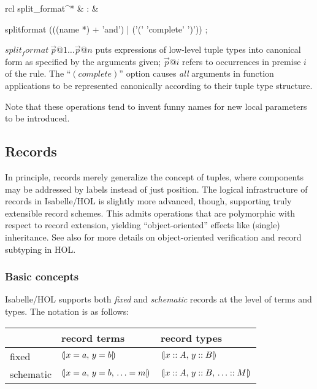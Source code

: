 \begin{matharray}{rcl}
  split_format^* & : & \isaratt \\
\end{matharray}


\begin{rail}
  splitformat (((name *) + 'and') | ('(' 'complete' ')'))
  ;
\end{rail}

\begin{descr}
  
\item [$split_format~\vec p@1 \dots \vec p@n$] puts expressions of low-level
  tuple types into canonical form as specified by the arguments given; $\vec
  p@i$ refers to occurrences in premise $i$ of the rule.  The ``$(complete)$''
  option causes \emph{all} arguments in function applications to be
  represented canonically according to their tuple type structure.

  Note that these operations tend to invent funny names for new local
  parameters to be introduced.

\end{descr}


\subsection{Records}\label{sec:hol-record}

In principle, records merely generalize the concept of tuples, where
components may be addressed by labels instead of just position.  The logical
infrastructure of records in Isabelle/HOL is slightly more advanced, though,
supporting truly extensible record schemes.  This admits operations that are
polymorphic with respect to record extension, yielding ``object-oriented''
effects like (single) inheritance.  See also \cite{NaraschewskiW-TPHOLs98} for
more details on object-oriented verification and record subtyping in HOL.


\subsubsection{Basic concepts}

Isabelle/HOL supports both \emph{fixed} and \emph{schematic} records at the
level of terms and types.  The notation is as follows:

\begin{center}
\begin{tabular}{l|l|l}
  & record terms & record types \\ \hline
  fixed & $\mathopen{(\!|} x = a\mathpunct{,\,} y = b \mathclose{|\!)}$ & $\mathopen{(\!|} x \mathrel{::} A\mathpunct{,\,} y \mathrel{::} B \mathclose{|\!)}$ \\
  schematic & $\mathopen{(\!|} x = a\mathpunct{,\,} y = b\mathpunct{,\,} \ldots = m \mathclose{|\!)}$ &
    $\mathopen{(\!|} x \mathrel{::} A\mathpunct{,\,} y \mathrel{::} B\mathpunct{,\,} \ldots \mathrel{::} M \mathclose{|\!)}$ \\
\end{tabular}
\end{center}

